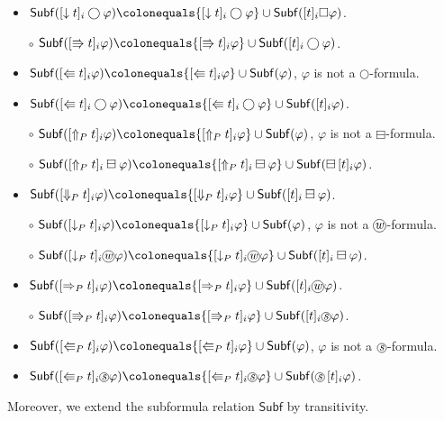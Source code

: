 \documentclass[envcountsect,envcountsame,oribibl,orivec]{llncs}
\newcommand*\circled[1]{\tikz[baseline=(char.base)]{
		\node[shape=circle,draw,inner sep=0.4pt] (char) {#1};}}
\newcommand{\lnext}{\bigcirc}
\newcommand{\lalways}{\Box}
\newcommand{\lsofar}{\boxminus}
\newcommand{\wprevious}{\circled{\textit{w}}}
\newcommand{\sprevious}{\circled{\textit{s}}}
\newcommand{\jbox}[1]{\left[#1\right]\!}
\newcommand{\tnext}{\Rrightarrow}
\newcommand{\tprev}{\Lleftarrow}
\newcommand{\tnextaccess}{\downarrow}
\newcommand{\thenceforthaccess}{\Downarrow_P}
\newcommand{\thenceforthgeneralize}{\Uparrow_P}
\newcommand{\tprevaccess}{\downarrow_P}
\newcommand{\tsprevright}{\Rrightarrow_P}
\newcommand{\tsprevleft}{\Lleftarrow_P}
\newcommand{\twprevright}{\Rightarrow_P}
\newcommand{\agent}{i}
\renewcommand{\phi}{\varphi}
\newcommand{\Subf}{\mathsf{Subf}}
\begin{document}
\begin{definition}
\begin{itemize}
		\item $\Subf(\jbox{\tnextaccess t}_\agent \lnext \phi) \colonequals \{\jbox{\tnextaccess t }_\agent \lnext \phi\} \cup \Subf(\jbox{t}_\agent \lalways \phi)$.
		\vspace*{0.1cm}
		\item[$\circ$] $\Subf(\jbox{\tnext t}_\agent \phi) \colonequals \{\jbox{\tnext t}_\agent \phi\} \cup \Subf(\jbox{t}_\agent \lnext \phi)$.
		\vspace*{0.1cm}
		\item $\Subf(\jbox{\tprev t}_\agent \phi) \colonequals \{\jbox{\tprev t}_\agent \phi\} \cup \Subf(\phi)$, $\phi$ is not a $\lnext$-formula.
		\item $\Subf(\jbox{\tprev t}_\agent \lnext \phi) \colonequals \{\jbox{\tprev t }_\agent \lnext \phi\} \cup \Subf(\jbox{t}_\agent \phi)$.
		\vspace*{0.1cm}
		\item[$\circ$] $\Subf(\jbox{\thenceforthgeneralize t}_\agent \phi) \colonequals \{\jbox{\thenceforthgeneralize t}_\agent \phi\} \cup \Subf(\phi)$, $\phi$ is not a $\lsofar$-formula.
		\item[$\circ$] $\Subf(\jbox{\thenceforthgeneralize t}_\agent \lsofar \phi) \colonequals \{\jbox{\thenceforthgeneralize t }_\agent \lsofar \phi\} \cup \Subf(\lsofar \jbox{t}_\agent \phi)$.
		\vspace*{0.1cm}
		\item $\Subf(\jbox{\thenceforthaccess t}_\agent \phi) \colonequals \{\jbox{\thenceforthaccess t}_\agent \phi\} \cup \Subf(\jbox{t}_\agent \lsofar \phi)$.
		\vspace*{0.1cm}
		\item[$\circ$] $\Subf(\jbox{\tprevaccess t}_\agent \phi) \colonequals \{\jbox{\tprevaccess t}_\agent \phi\} \cup \Subf(\phi)$, $\phi$ is not a $\wprevious$-formula.
		\item[$\circ$] $\Subf(\jbox{\tprevaccess t}_\agent \wprevious \phi) \colonequals \{\jbox{\tprevaccess t }_\agent \wprevious \phi\} \cup \Subf(\jbox{t}_\agent \lsofar \phi)$.
		\vspace*{0.1cm}
		\item $\Subf(\jbox{\twprevright t}_\agent \phi) \colonequals \{\jbox{\twprevright t}_\agent \phi\} \cup \Subf(\jbox{t}_\agent \wprevious \phi)$.
		\vspace*{0.1cm}
		\item[$\circ$] $\Subf(\jbox{\tsprevright t}_\agent \phi) \colonequals \{\jbox{\tsprevright t}_\agent \phi\} \cup \Subf(\jbox{t}_\agent \sprevious \phi)$.
		\vspace*{0.1cm}
		\item $\Subf(\jbox{\tsprevleft t}_\agent \phi) \colonequals \{\jbox{\tsprevleft t}_\agent \phi\} \cup \Subf(\phi)$, $\phi$ is not a $\sprevious$-formula.
		\item $\Subf(\jbox{\tsprevleft t}_\agent \sprevious \phi) \colonequals \{\jbox{\tsprevleft t }_\agent \sprevious \phi\} \cup \Subf(\sprevious \jbox{t}_\agent  \phi)$.
		
	\end{itemize}
	Moreover, we extend the subformula relation $\Subf$ by transitivity.
\end{definition}
\end{document}
